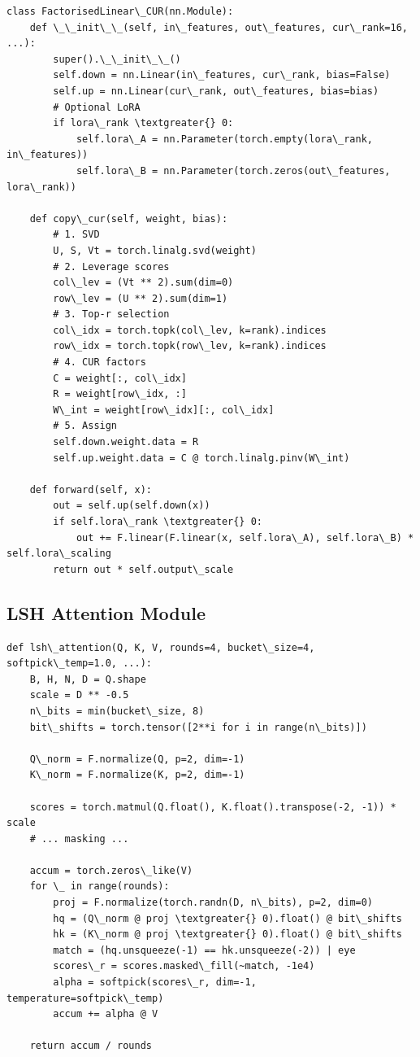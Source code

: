 \begin{lstlisting}
class FactorisedLinear\_CUR(nn.Module):
    def \_\_init\_\_(self, in\_features, out\_features, cur\_rank=16, ...):
        super().\_\_init\_\_()
        self.down = nn.Linear(in\_features, cur\_rank, bias=False)
        self.up = nn.Linear(cur\_rank, out\_features, bias=bias)
        # Optional LoRA
        if lora\_rank \textgreater{} 0:
            self.lora\_A = nn.Parameter(torch.empty(lora\_rank, in\_features))
            self.lora\_B = nn.Parameter(torch.zeros(out\_features, lora\_rank))
    
    def copy\_cur(self, weight, bias):
        # 1. SVD
        U, S, Vt = torch.linalg.svd(weight)
        # 2. Leverage scores
        col\_lev = (Vt ** 2).sum(dim=0)
        row\_lev = (U ** 2).sum(dim=1)
        # 3. Top-r selection
        col\_idx = torch.topk(col\_lev, k=rank).indices
        row\_idx = torch.topk(row\_lev, k=rank).indices
        # 4. CUR factors
        C = weight[:, col\_idx]
        R = weight[row\_idx, :]
        W\_int = weight[row\_idx][:, col\_idx]
        # 5. Assign
        self.down.weight.data = R
        self.up.weight.data = C @ torch.linalg.pinv(W\_int)
    
    def forward(self, x):
        out = self.up(self.down(x))
        if self.lora\_rank \textgreater{} 0:
            out += F.linear(F.linear(x, self.lora\_A), self.lora\_B) * self.lora\_scaling
        return out * self.output\_scale
\end{lstlisting}

\subsection{LSH Attention Module}

\begin{lstlisting}
def lsh\_attention(Q, K, V, rounds=4, bucket\_size=4, softpick\_temp=1.0, ...):
    B, H, N, D = Q.shape
    scale = D ** -0.5
    n\_bits = min(bucket\_size, 8)
    bit\_shifts = torch.tensor([2**i for i in range(n\_bits)])
    
    Q\_norm = F.normalize(Q, p=2, dim=-1)
    K\_norm = F.normalize(K, p=2, dim=-1)
    
    scores = torch.matmul(Q.float(), K.float().transpose(-2, -1)) * scale
    # ... masking ...
    
    accum = torch.zeros\_like(V)
    for \_ in range(rounds):
        proj = F.normalize(torch.randn(D, n\_bits), p=2, dim=0)
        hq = (Q\_norm @ proj \textgreater{} 0).float() @ bit\_shifts
        hk = (K\_norm @ proj \textgreater{} 0).float() @ bit\_shifts
        match = (hq.unsqueeze(-1) == hk.unsqueeze(-2)) | eye
        scores\_r = scores.masked\_fill(~match, -1e4)
        alpha = softpick(scores\_r, dim=-1, temperature=softpick\_temp)
        accum += alpha @ V
    
    return accum / rounds
\end{lstlisting}

